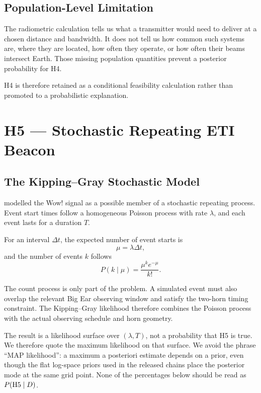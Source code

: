 \documentclass[crop]{CSL}
\begin{document}
\subsection{Population-Level Limitation}

The radiometric calculation tells us what a transmitter would need to deliver at a chosen distance and bandwidth. It does not tell us how common such systems are, where they are located, how often they operate, or how often their beams intersect Earth. Those missing population quantities prevent a posterior probability for H4.

H4 is therefore retained as a conditional feasibility calculation rather than promoted to a probabilistic explanation.


\section{H5 --- Stochastic Repeating ETI Beacon}
\label{sec:h5}

\subsection{The Kipping--Gray Stochastic Model}

\citet{kipping2022} modelled the Wow! signal as a possible member of a stochastic repeating process. Event start times follow a homogeneous Poisson process with rate $\lambda$, and each event lasts for a duration $T$.

For an interval $\Delta t$, the expected number of event starts is
\begin{equation}
\mu=\lambda\Delta t,
\end{equation}
and the number of events $k$ follows
\begin{equation}
P(k\mid\mu)=
\frac{\mu^k e^{-\mu}}{k!}.
\label{eq:poisson}
\end{equation}

The count process is only part of the problem. A simulated event must also overlap the relevant Big Ear observing window and satisfy the two-horn timing constraint. The Kipping--Gray likelihood therefore combines the Poisson process with the actual observing schedule and horn geometry.

The result is a likelihood surface over $(\lambda,T)$, not a probability that H5 is true. We therefore quote the maximum likelihood on that surface. We avoid the phrase ``MAP likelihood'': a maximum a posteriori estimate depends on a prior, even though the flat log-space priors used in the released chains place the posterior mode at the same grid point. None of the percentages below should be read as $P({\rm H5}\mid D)$.
\end{document}
